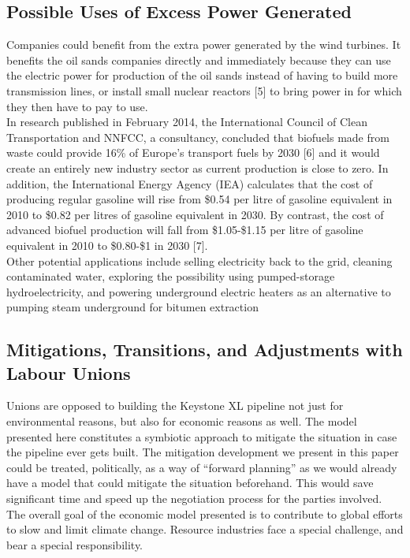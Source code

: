 \documentclass[11pt]{article}
\begin{document}
\subsection{Possible Uses of Excess Power Generated}

\indent Companies could benefit from the extra power generated by the wind turbines. It benefits the oil sands companies directly and immediately because they can use the electric power for production of the oil sands instead of having to build more transmission lines, or install small nuclear reactors [5] to bring power in for which they then have to pay to use. \\
\indent In research published in February 2014, the International Council of Clean Transportation and NNFCC, a consultancy, concluded that biofuels made from waste could provide 16\% of Europe’s transport fuels by 2030 [6] and it would create an entirely new industry sector as current production is close to zero. In addition, the International Energy Agency (IEA) calculates that the cost of producing regular gasoline will rise from \$0.54 per litre of gasoline equivalent in 2010 to \$0.82 per litres of gasoline equivalent in 2030. By contrast, the cost of advanced biofuel production will fall from \$1.05-\$1.15 per litre of gasoline equivalent in 2010 to \$0.80-\$1 in 2030 [7]. \\
\indent Other potential applications include selling electricity back to the grid, cleaning contaminated water, exploring the possibility using pumped-storage hydroelectricity, and powering underground electric heaters as an alternative to pumping steam underground for bitumen extraction

\subsection{Mitigations, Transitions, and Adjustments with Labour Unions}
\indent Unions are opposed to building the Keystone XL pipeline not just for environmental reasons, but also for economic reasons as well. The model presented here constitutes a symbiotic approach to mitigate the situation in case the pipeline ever gets built. The mitigation development we present in this paper could be treated, politically, as a way of ``forward planning'' as we would already have a model that could mitigate the situation beforehand. This would save significant time and speed up the negotiation process for the parties involved.  \\
\indent The overall goal of the economic model presented is to contribute to global efforts to slow and limit climate change. Resource industries face a special challenge, and bear a special responsibility.
\end{document}

